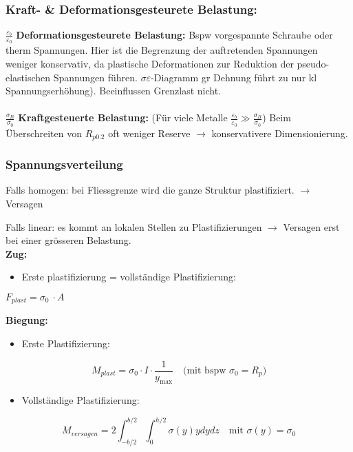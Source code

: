             \subsubsection{Kraft- \& Deformationsgesteurete Belastung:}
            $\frac{\varepsilon_b}{\varepsilon_0}$ \textbf{Deformationsgesteurete Belastung:} Bspw vorgespannte Schraube oder therm Spannungen. Hier ist die Begrenzung der auftretenden Spannungen weniger konservativ, da plastische Deformationen zur Reduktion der pseudo-elastischen Spannungen führen. $\sigma\varepsilon$-Diagramm gr Dehnung führt zu nur kl Spannungserhöhung). Beeinflussen Grenzlast nicht.\\\\ 
            $\frac{\sigma_B}{\sigma_0}$ \textbf{Kraftgesteuerte Belastung:} (Für viele Metalle $\frac{\varepsilon_b}{\varepsilon_0} \gg \frac{\sigma_B}{\sigma_0}$) Beim Überschreiten von $R_{p0.2}$ oft weniger Reserve $\rightarrow$ konservativere Dimensionierung.
        
        \subsubsection{Spannungsverteilung}
            Falls homogen: bei Fliessgrenze wird die ganze Struktur plastifiziert. $\rightarrow$ Versagen %
              
            Falls linear: es kommt an lokalen Stellen zu Plastifizierungen $\rightarrow$ Versagen erst bei einer grösseren Belastung.\\
            \textbf{Zug:}
            \vspace{-2mm}
            \begin{itemize}
                \item Erste plastifizierung = vollständige Plastifizierung:
            \end{itemize}
            \vspace{-2mm}
            \begin{center}
                $\displaystyle F_{plast} = \sigma_0\ \cdot A$
            \end{center}
            
            \vspace{-4mm}
            \textbf{Biegung:}
            \vspace{-2mm}
            \begin{itemize}
                \item Erste Plastifizierung:
            \end{itemize}
            \[M_{plast} = \sigma_0\cdot I\cdot\frac{1}{y_{\textrm{max}}} \quad\textrm{(mit bspw $\sigma_0 = R_p$)}\]
            \begin{itemize}
                \item Vollständige Plastifizierung:
            \end{itemize}
            \[M_{versagen} = 2\int_{-b/2}^{b/2}\int_{0}^{h/2}\sigma(y)ydydz \quad\textrm{mit $\sigma(y) = \sigma_0$}\]
            
